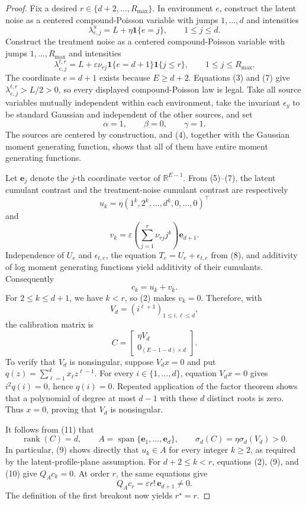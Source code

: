 \documentclass{article}
\begin{document}
\begin{proof}
Fix a desired \(r\in\{d+2,\ldots,R_{\max}\}\).  In environment \(e\), construct the latent noise as a centered compound-Poisson variable with jumps \(1,\ldots,d\) and intensities
\[
 \lambda^{u}_{e,j}=L+\eta\mathbf 1\{e=j\},
 \qquad 1\leq j\leq d.
 \tag{6}
\]
Construct the treatment noise as a centered compound-Poisson variable with jumps \(1,\ldots,R_{\max}\) and intensities
\[
 \lambda^{t,r}_{e,j}
 =L+\varepsilon\nu_{rj}\mathbf 1\{e=d+1\}\mathbf 1\{j\leq r\},
 \qquad 1\leq j\leq R_{\max}.
 \tag{7}
\]
The coordinate \(e=d+1\) exists because \(E\geq d+2\).  Equations (3) and (7) give \(\lambda^{t,r}_{e,j}>L/2>0\), so every displayed compound-Poisson law is legal.  Take all source variables mutually independent within each environment, take the invariant \(\epsilon_y\) to be standard Gaussian and independent of the other sources, and set
\[
 \alpha=1,
 \qquad \beta=0,
 \qquad \gamma=1.
 \tag{8}
\]
The sources are centered by construction, and (4), together with the Gaussian moment generating function, shows that all of them have entire moment generating functions.

Let \(\mathbf e_j\) denote the \(j\)-th coordinate vector of \(\mathbb R^{E-1}\).  From (5)--(7), the latent cumulant contrast and the treatment-noise cumulant contrast are respectively
\[
 u_k=\eta(1^k,2^k,\ldots,d^k,0,\ldots,0)^\top
\]
and
\[
 v_k
 =\varepsilon\left(\sum_{j=1}^{r}\nu_{rj}j^k\right)\mathbf e_{d+1}.
 \tag{9}
\]
Independence of \(U_e\) and \(\epsilon_{t,e}\), the equation \(T_e=U_e+\epsilon_{t,e}\) from (8), and additivity of log moment generating functions yield additivity of their cumulants.  Consequently
\[
 c_k=u_k+v_k.
 \tag{10}
\]
For \(2\leq k\leq d+1\), we have \(k<r\), so (2) makes \(v_k=0\).  Therefore, with
\[
 V_d=(i^{\ell+1})_{1\leq i,\ell\leq d},
\]
the calibration matrix is
\[
 C=
 \begin{bmatrix}
  \eta V_d\\
  0_{(E-1-d)\times d}
 \end{bmatrix}.
 \tag{11}
\]
To verify that \(V_d\) is nonsingular, suppose \(V_dx=0\) and put \(q(z)=\sum_{\ell=1}^d x_\ell z^{\ell-1}\).  For every \(i\in\{1,\ldots,d\}\), equation \(V_dx=0\) gives \(i^2q(i)=0\), hence \(q(i)=0\).  Repeated application of the factor theorem shows that a polynomial of degree at most \(d-1\) with these \(d\) distinct roots is zero.  Thus \(x=0\), proving that \(V_d\) is nonsingular.

It follows from (11) that
\[
 \operatorname{rank}(C)=d,
 \qquad
 A=\operatorname{span}\{\mathbf e_1,\ldots,\mathbf e_d\},
 \qquad
 \sigma_d(C)=\eta\sigma_d(V_d)>0.
 \tag{12}
\]
In particular, (9) shows directly that \(u_k\in A\) for every integer \(k\geq2\), as required by the latent-profile-plane assumption.  For \(d+2\leq k<r\), equations (2), (9), and (10) give \(Q_Ac_k=0\).  At order \(r\), the same equations give
\[
 Q_Ac_r
 =\varepsilon r!\,\mathbf e_{d+1}\neq0.
 \tag{13}
\]
The definition of the first breakout now yields \(r^\star=r\).


\end{proof}
\end{document}
